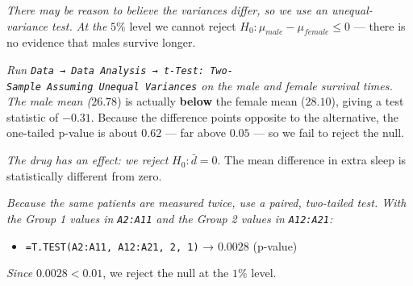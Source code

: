 \documentclass[
  11pt,
  letterpaper,
  DIV=11,
  numbers=noendperiod,
  oneside,
  open=any]{scrreprt}
\providecommand{\tightlist}{%
  \setlength{\itemsep}{0pt}\setlength{\parskip}{0pt}}\usepackage{longtable,booktabs,array}
\newenvironment{bsanswerkey}[2]{%
  \begin{tcolorbox}[bsbase, colback=bspaper2, colframe=bsline, fontupper=\small,
    title={\hypertarget{a-#1}{}\label{a-#1}\hyperlink{q-#1}{\textcolor{bsink2}{\MakeUppercase{#2}}}\hfill
      \hyperlink{q-#1}{\textcolor{bsaccent}{\normalfont\footnotesize back to page \pageref{q-#1}}}}]}%
  {\end{tcolorbox}}
\begin{document}
\begin{bsanswerkey}{bsans133}{Exercise 2, question 2}

\emph{There may be reason to believe the variances differ, so we use an
unequal-variance test. At the} \(5\%\) level we cannot reject
\(H_{0}: \mu_{male} - \mu_{female} \leq 0\) --- there is no evidence
that males survive longer.

\emph{Run
\texttt{Data\ →\ Data\ Analysis\ →\ t-Test:\ Two-Sample\ Assuming\ Unequal\ Variances}
on the male and female survival times. The male mean (}\(26.78\)) is
actually \textbf{below} the female mean (\(28.10\)), giving a test
statistic of \(-0.31\). Because the difference points opposite to the
alternative, the one-tailed p-value is about \(0.62\) --- far above
\(0.05\) --- so we fail to reject the null.

\end{bsanswerkey}

\begin{bsanswerkey}{bsans134}{Exercise 3}

\emph{The drug has an effect: we reject} \(H_{0}: \bar{d} = 0\). The
mean difference in extra sleep is statistically different from zero.

\emph{Because the same patients are measured twice, use a paired,
two-tailed test. With the Group 1 values in \texttt{A2:A11} and the
Group 2 values in \texttt{A12:A21}:}

\begin{itemize}
\tightlist
\item
  \texttt{=T.TEST(A2:A11,\ A12:A21,\ 2,\ 1)} → \(0.0028\) (p-value)
\end{itemize}

\emph{Since} \(0.0028 < 0.01\), we reject the null at the \(1\%\) level.

\end{bsanswerkey}
\end{document}
